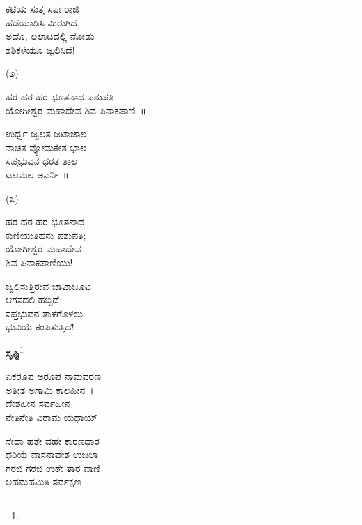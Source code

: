 \begin{myquote}
ಕಟಿಯ ಸುತ್ತ ಸರ್ಪರಾಜಿ\\ಹೆಡೆಯಾಡಿಸಿ ಮಿರುಗಿದೆ,\\ಅದೊ, ಲಲಾಟದಲ್ಲಿ ನೋಡು\\ಶಶಿಕಳೆಯೂ ಜ್ವಲಿಸಿದೆ!
\end{myquote}

\begin{center}
(೨)
\end{center}

\begin{myquote}
ಹರ ಹರ ಹರ ಭೂತನಾಥ ಪಶುಪತಿ\\ಯೋಗೀಶ್ವರ ಮಹಾದೇವ ಶಿವ ಪಿನಾಕಪಾಣಿ~॥
\end{myquote}

\begin{myquote}
ಉರ್ಧ್ವ ಜ್ವಲತ ಜಟಾಜಾಲ\\ನಾಚತ ವ್ಯೋಮಕೇಶ ಭಾಲ\\ಸಪ್ತಭುವನ ಧರತ ತಾಲ\\ಟಲಮಲ ಅವನೀ~॥
\end{myquote}

\begin{center}
(೩)
\end{center}

\begin{myquote}
ಹರ ಹರ ಹರ ಭೂತನಾಥ\\ಕುಣಿಯುತಿಹನು ಪಶುಪತಿ;\\ಯೋಗೀಶ್ವರ ಮಹಾದೇವ\\ಶಿವ ಪಿನಾಕಪಾಣಿಯು!
\end{myquote}

\begin{myquote}
ಜ್ವಲಿಸುತ್ತಿರುವ ಜಾಟಾಜೂಟ\\ಆಗಸದಲಿ ಹಬ್ಬಿದೆ;\\ಸಪ್ತಭುವನ ತಾಳಗೊಳಲು\\ಭುವಿಯೆ ಕಂಪಿಸುತ್ತಿದೆ!
\end{myquote}

\begin{center}
\textbf{ಸೃಷ್ಟಿ}\footnote{}
\end{center}

\begin{myquote}
ಏಕರೂಪ ಅರೂಪ ನಾಮವರಣ\\ಅತೀತ ಅಗಾಮಿ ಕಾಲಹೀನ~।\\ದೇಶಹೀನ ಸರ್ವಹೀನ\\ನೇತಿನೇತಿ ವಿರಾಮ ಯಥಾಯ್
\end{myquote}


\begin{myquote}
ಸೇಥಾ ಹತೇ ವಹೇ ಕಾರಣಧಾರ\\ಧರಿಯೆ ವಾಸನಾವೇಶ ಉಜಲಾ\\ಗರಜಿ ಗರಜಿ ಉಠೇ ತಾರ ವಾಣಿ\\ಅಹಮಹಮಿತಿ ಸರ್ವಕ್ಷಣ
\end{myquote}

